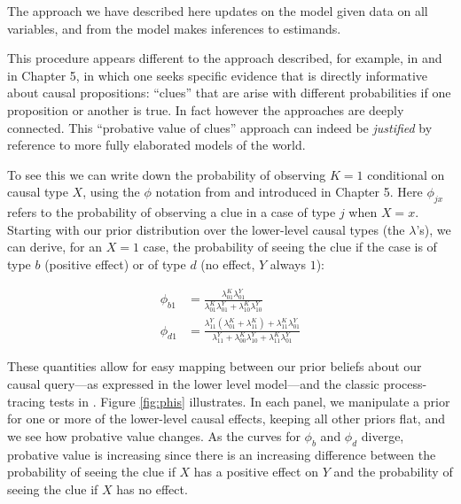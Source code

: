 \documentclass[12pt,]{book}
\begin{document}
The approach we have described here updates on the model given data on all variables, and from the model makes inferences to estimands.

This procedure appears different to the approach described, for example, in \citet{collier2004sources} and in Chapter 5, in which one seeks specific evidence that is directly informative about causal propositions: ``clues'' that are arise with different probabilities if one proposition or another is true. In fact however the approaches are deeply connected. This ``probative value of clues'' approach can indeed be \emph{justified} by reference to more fully elaborated models of the world.

To see this we can write down the probability of observing \(K=1\) conditional on causal type \(X\), using the \(\phi\) notation from \citet{humphreys2015mixing} and introduced in Chapter 5. Here \(\phi_{jx}\) refers to the probability of observing a clue in a case of type \(j\) when \(X=x\). Starting with our prior distribution over the lower-level causal types (the \(\lambda\)'s), we can derive, for an \(X=1\) case, the probability of seeing the clue if the case is of type \(b\) (positive effect) or of type \(d\) (no effect, \(Y\) always \(1\)):

\begin{equation}
\begin{split}
\phi_{b1} & = \frac{\lambda_{01}^{K}\lambda_{01}^{Y}}{\lambda_{01}^{K}\lambda_{01}^{Y}+\lambda_{10}^{K}\lambda_{10}^{Y}}\\ 
\phi_{d1} & = \frac{\lambda_{11}^{Y}(\lambda_{01}^{K}+\lambda_{11}^{K})+\lambda_{11}^{K}\lambda_{01}^{Y}}{\lambda_{11}^{Y} + \lambda_{00}^{K}\lambda_{10}^{Y} + \lambda_{11}^{K}\lambda_{01}^{Y}}
\end{split}
\label{eqn:phisfromlambdas}
\end{equation}

These quantities allow for easy mapping between our prior beliefs about our causal query---as expressed in the lower level model---and the classic process-tracing tests in \citet{Van-Evera:1997}. Figure \ref{fig:phis} illustrates. In each panel, we manipulate a prior for one or more of the lower-level causal effects, keeping all other priors flat, and we see how probative value changes. As the curves for \(\phi_b\) and \(\phi_d\) diverge, probative value is increasing since there is an increasing difference between the probability of seeing the clue if \(X\) has a positive effect on \(Y\) and the probability of seeing the clue if \(X\) has no effect.
\end{document}
